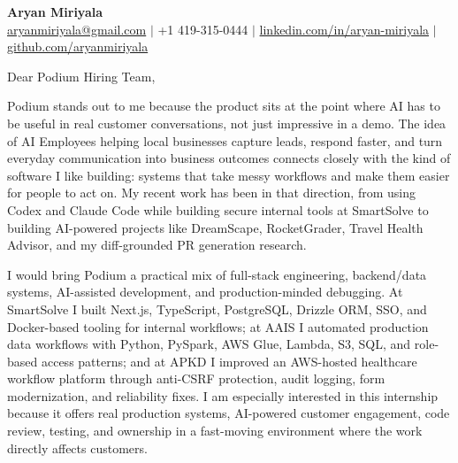 \documentclass[11pt]{letter}
\begin{document}
\begin{center}
{\Large \textbf{Aryan Miriyala}}\\
\href{mailto:aryanmiriyala@gmail.com}{aryanmiriyala@gmail.com} $|$ +1 419-315-0444 $|$
\href{https://www.linkedin.com/in/aryan-miriyala-7788a21b6/}{linkedin.com/in/aryan-miriyala} $|$
\href{https://github.com/aryanmiriyala}{github.com/aryanmiriyala}
\end{center}

\vspace{0.15in}

Dear Podium Hiring Team,

Podium stands out to me because the product sits at the point where AI has to be useful in real customer conversations, not just impressive in a demo. The idea of AI Employees helping local businesses capture leads, respond faster, and turn everyday communication into business outcomes connects closely with the kind of software I like building: systems that take messy workflows and make them easier for people to act on. My recent work has been in that direction, from using Codex and Claude Code while building secure internal tools at SmartSolve to building AI-powered projects like DreamScape, RocketGrader, Travel Health Advisor, and my diff-grounded PR generation research.

I would bring Podium a practical mix of full-stack engineering, backend/data systems, AI-assisted development, and production-minded debugging. At SmartSolve I built Next.js, TypeScript, PostgreSQL, Drizzle ORM, SSO, and Docker-based tooling for internal workflows; at AAIS I automated production data workflows with Python, PySpark, AWS Glue, Lambda, S3, SQL, and role-based access patterns; and at APKD I improved an AWS-hosted healthcare workflow platform through anti-CSRF protection, audit logging, form modernization, and reliability fixes. I am especially interested in this internship because it offers real production systems, AI-powered customer engagement, code review, testing, and ownership in a fast-moving environment where the work directly affects customers.
\end{document}
